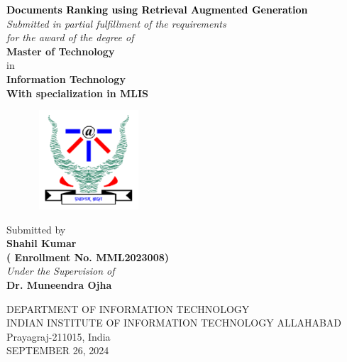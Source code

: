 \newpage
\thispagestyle{empty}
\graphicspath{{Figures/PNG/}{Figures/}}
\begin{center}
	\vspace{8mm}
	\huge \textcolor{black}{\textbf{Documents Ranking using Retrieval Augmented Generation 
	}} \\
	\vspace{10mm}
	\large \textit{Submitted in partial fulfillment of the requirements \\ for the award of the degree of} \\
	\vspace{10mm}
	\Large {\textbf{Master of Technology}} \\
        \large in \\
        \Large {\textbf{Information Technology}} \\
	\Large {\textbf{With specialization in MLIS}} \\
    \begin{figure}[h!]
		\centering
		\includegraphics[height=3.7cm,width=4cm]{IMAGE/IIITAlogo.png}
	\end{figure}
    \vspace{10mm}
    \large Submitted by \\
    \vspace{6mm}
	\textbf{{\Large Shahil Kumar} \\ {\large ( Enrollment No. MML2023008)}} \\
	\vspace{6mm}
	\emph{Under the Supervision of }\\
    \textbf{Dr. Muneendra Ojha}  \\
    \vspace{4mm}
	\par\vspace{1mm}
 \vspace{15mm}
	\large {DEPARTMENT OF INFORMATION TECHNOLOGY\\
	INDIAN INSTITUTE OF INFORMATION TECHNOLOGY ALLAHABAD\\
			Prayagraj-211015, India\\
    \vspace{5mm}
    SEPTEMBER 26, 2024}
\end{center}
